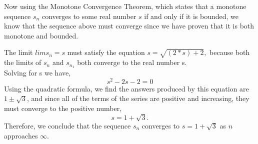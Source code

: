 \documentclass{article}
\begin{document}
\bigskip

Now using the Monotone Convergence Theorem, which states that a monotone sequence $s_n$ converges to some real number $s$ if and only if it is bounded, we know that the sequence above must converge since we have proven that it is both monotone and bounded.
\bigskip

The limit $lim s_n = s$ must satisfy the equation $s=\sqrt{(2*s) + 2},$ because both the limits of $s_n$ and $s_{n_1}$ both converge to the real number s.\\
Solving for s we have,
$$s^2-2s-2=0$$
Using the quadratic formula, we find the answers produced by this equation are $1 \pm \sqrt{3}$, and since all of the terms of the series are positive and increasing, they must converge to the positive number,
$$s=1+\sqrt{3}.$$
Therefore, we conclude that the sequence $s_n$ converges to $s=1+\sqrt{3}$ as $n$ approaches $\infty.$
\end{document}
